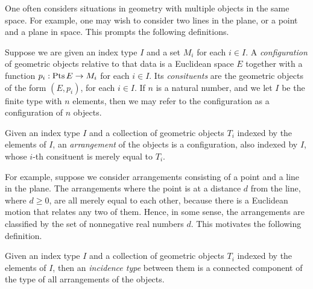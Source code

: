 One often considers situations in geometry with multiple objects in the same
space.  For example, one may wish to consider two lines in the plane, or a
point and a plane in space.  This prompts the following definitions.

\begin{definition}
  Suppose we are given an index type $I$ and a set $M_i$ for each $i\in I$.  A
  {\em configuration} of geometric objects relative to that data is a Euclidean
  space $E$ together with a function $p_i : \Points E \to M_i$ for each
  $i\in I$.  Its {\em consituents} are the geometric objects of the form
  $(E,p_i)$, for each $i \in I$.  If $n$ is a natural number, and we let $I$ be
  the finite type with $n$ elements, then we may refer to the configuration as
  a configuration of $n$ objects.  
\end{definition}

\begin{definition}
  Given an index type $I$ and a collection of geometric objects $T_i$ indexed
  by the elements of $I$, an {\em arrangement} of the objects is a
  configuration, also indexed by $I$, whose $i$-th consituent is merely equal to
  $T_i$.
\end{definition}

For example, suppose we consider arrangements consisting of a point and a line
in the plane.  The arrangements where the point is at a distance $d$ from the
line, where $d \ge 0$, are all merely equal to each other, because there is a
Euclidean motion that relates any two of them.  Hence, in some sense, the
arrangements are classified by the set of nonnegative real numbers $d$.  This
motivates the following definition.

\begin{definition}
  Given an index type $I$ and a collection of geometric objects $T_i$ indexed
  by the elements of $I$, then an {\em incidence type} between them is a
  connected component of the type of all arrangements of the objects.
\end{definition}

